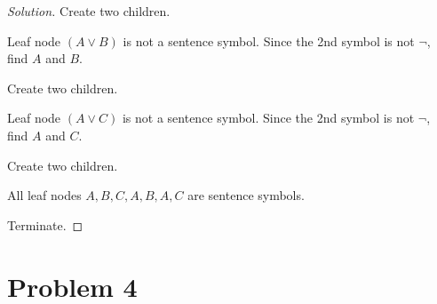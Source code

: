 \documentclass{article}
\newenvironment{solution}{\begin{proof}[\noindent\it Solution]}{\end{proof}}
\begin{document}
\begin{solution}
    \hspace{2.6em}
    Create two children.

    \hspace{2.6em}
    Leaf node $\left(A\lor B\right)$ is not a sentence symbol. Since the 2nd symbol is not $\neg$, find $A$ and $B$. 
    
    \hspace{2.6em}
    Create two children.

    \hspace{2.6em}
    Leaf node $\left(A\lor C\right)$ is not a sentence symbol. Since the 2nd symbol is not $\neg$, find $A$ and $C$. 
    
    \hspace{2.6em}
    Create two children.

    \hspace{2.6em}
    All leaf nodes $A,B,C,A,B,A,C$ are sentence symbols. 
    
    \hspace{2.6em}
    Terminate.
\end{solution}

\vspace{1em}
\section{Problem 4}
\vspace{1em}
\end{document}

